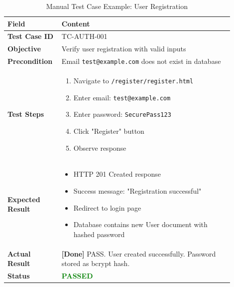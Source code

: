 \documentclass[12pt, a4paper]{report}
\begin{document}
{{\begin{table}[H]
\centering
\caption{Manual Test Case Example: User Registration}
\label{tab:test_register}
\small
\begin{tabular}{@{}p{0.18\linewidth}p{0.72\linewidth}@{}}
\toprule
\textbf{Field} & \textbf{Content} \\
\midrule
\textbf{Test Case ID} & TC-AUTH-001 \\
\textbf{Objective} & Verify user registration with valid inputs \\
\textbf{Precondition} & Email \texttt{test@example.com} does not exist in database \\
\textbf{Test Steps} & 
\begin{minipage}[t]{\linewidth}
\begin{enumerate}[nosep,leftmargin=*]
    \item Navigate to \texttt{/register/register.html}
    \item Enter email: \texttt{test@example.com}
    \item Enter password: \texttt{SecurePass123}
    \item Click "Register" button
    \item Observe response
\end{enumerate}
\end{minipage} \\
\textbf{Expected Result} & 
\begin{minipage}[t]{\linewidth}
\begin{itemize}[nosep,leftmargin=*]
    \item HTTP 201 Created response
    \item Success message: "Registration successful"
    \item Redirect to login page
    \item Database contains new User document with hashed password
\end{itemize}
\end{minipage} \\
\textbf{Actual Result} & \textbf{[Done]} PASS. User created successfully. Password stored as bcrypt hash. \\
\textbf{Status} & \textcolor{green}{\textbf{PASSED}} \\
\bottomrule
\end{tabular}
\end{table}

}}
\end{document}
